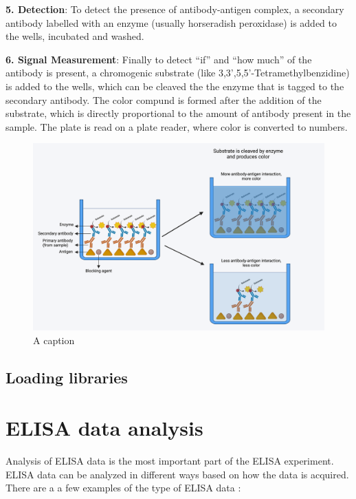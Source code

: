 \documentclass[
]{book}
\begin{document}
\textbf{5. Detection}: To detect the presence of antibody-antigen complex, a secondary antibody labelled with an enzyme (usually horseradish peroxidase) is added to the wells, incubated and washed.

\textbf{6. Signal Measurement}: Finally to detect ``if'' and ``how much'' of the antibody is present, a chromogenic substrate (like 3,3',5,5'-Tetramethylbenzidine) is added to the wells, which can be cleaved the the enzyme that is tagged to the secondary antibody. The color compund is formed after the addition of the substrate, which is directly proportional to the amount of antibody present in the sample. The plate is read on a plate reader, where color is converted to numbers.

\begin{figure}
\includegraphics[width=1\linewidth]{DATA/elisa} \caption{A caption}\label{fig:pressure}
\end{figure}

\hypertarget{loading-libraries}{%
\subsection{Loading libraries}\label{loading-libraries}}

\hypertarget{elisa-data-analysis}{%
\section{ELISA data analysis}\label{elisa-data-analysis}}

Analysis of ELISA data is the most important part of the ELISA experiment. ELISA data can be analyzed in different ways based on how the data is acquired. There are a a few examples of the type of ELISA data :
\end{document}
